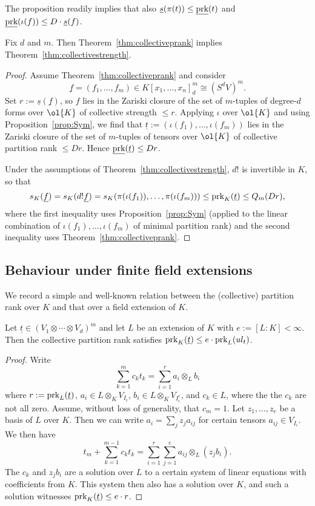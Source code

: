 \documentclass{amsart}
\newcommand{\prk}{\textnormal{prk}}
\newcommand{\ul}[1]{\underline{#1}}
\begin{document}
\begin{re}
The proposition readily implies that also $\ul{s}(\pi(t)) \leq \ul{\prk}(t)$
and $\ul{\prk}(\iota(f)) \leq D\cdot \ul{s}(f)$.
\end{re}

\begin{prop}
Fix $d$ and $m$. Then Theorem~\ref{thm:collectiveprank} implies
Theorem~\ref{thm:collectivestrength}.
\end{prop}

\begin{proof}
Assume Theorem~\ref{thm:collectiveprank} and consider
\[ \ul{f}=(f_1,\ldots,f_m) \in K[x_1,\ldots,x_n]_d^m \cong (S^d V)^m. \]
Set $r:=\ul{s}(\ul{f})$, so $f$ lies in the Zariski closure of the set of
$m$-tuples of degree-$d$ forms over $\ol{K}$ of collective strength $\leq
r$. Applying $\iota$ over $\ol{K}$ and using Proposition~\ref{prop:Sym},
we find that $\ul{t}:=(\iota(f_1),\ldots,\iota(f_m))$ lies in the Zariski
closure of the set of $m$-tuples of tensors over $\ol{K}$ of collective
partition rank $\leq D r$. Hence $\ul{\prk}(\ul{t}) \leq D r$. 

Under the assumptions of Theorem~\ref{thm:collectivestrength}, $d!$ is
invertible in $K$, so that 
\[ s_K(\ul{f})=s_K(d!\ul{f})=s_K(\pi(\iota(f_1)),\ldots,\pi(\iota(f_m)))
\leq \prk_K(\ul{t}) \leq Q_m(Dr), \]
where the first inequality uses Proposition~\ref{prop:Sym} (applied to
the linear combination of $\iota(f_1),\ldots,\iota(f_m)$ of minimal partition rank) and the second
inequality uses Theorem~\ref{thm:collectiveprank}.
\end{proof}

\subsection{Behaviour under finite field extensions}

We record a simple and well-known relation between the (collective)
partition rank over $K$ and that over a field extension of $K$.

\begin{prop} \label{prop:FieldExtension}
Let $\ul{t} \in (V_1 \otimes \cdots \otimes V_d)^m$ and let $L$ be an extension
of $K$ with $e:=[L:K]<\infty$. Then the collective partition rank
satisfies $\prk_K(\ul{t}) \leq e \cdot \prk_L(ul_{t})$.
\end{prop}

\begin{proof}
Write 
\[ \sum_{k=1}^m c_k t_k=\sum_{i=1}^r a_i \otimes_L b_i \]
where $r:=\prk_L(\ul{t})$, $a_i \in L \otimes_K V_{I_i}$, $b_i \in L
\otimes_K V_{I_i^c}$, and $c_k \in L$, where the the $c_k$ are not
all zero. Assume, without loss of generality, that $c_m=1$. 
Let $z_1,\ldots,z_e$ be a basis of $L$ over
$K$. Then we can write $a_i=\sum_j z_j a_{ij}$ for certain tensors $a_{ij}
\in V_{I_i}$. We then have
\[ t_m + \sum_{k=1}^{m-1} c_k t_k=\sum_{i=1}^r \sum_{j=1}^e a_{ij} \otimes_L (z_j b_i). \]
The $c_k$ and $z_j b_i$ are a solution over $L$ to a certain system
of linear equations with coefficients from $K$. This system then also has a solution
over $K$, and such a solution witnesses $\prk_K(\ul{t}) \leq e \cdot r$. 
\end{proof}
\end{document}
